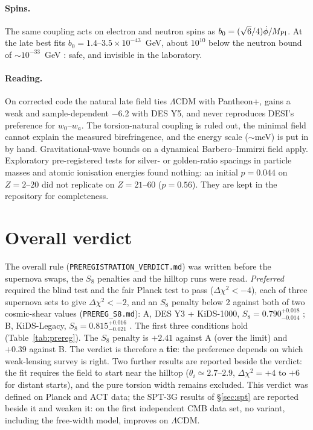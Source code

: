 \documentclass[11pt]{article}
\newcommand{\Mp}{M_{\rm Pl}}
\begin{document}
\paragraph{Spins.} The same coupling acts on electron and neutron spins as $b_0=(\sqrt6/4)\dot\phi/\Mp$. At the late
best fits $b_0=1.4$--$3.5\times10^{-43}$~GeV, about $10^{10}$ below the neutron bound of $\sim10^{-33}$~GeV
\cite{brown2010}: safe, and invisible in the laboratory.

\paragraph{Reading.} On corrected code the natural late field ties $\Lambda$CDM with Pantheon+, gains a weak and
sample-dependent $-6.2$ with DES Y5, and never reproduces DESI's preference for $w_0$--$w_a$. The torsion-natural
coupling is ruled out, the minimal field cannot explain the measured birefringence, and the energy scale ($\sim$meV)
is put in by hand. Gravitational-wave bounds on a dynamical Barbero--Immirzi field \cite{gao2026} apply. Exploratory
pre-registered tests for silver- or golden-ratio spacings in particle masses and atomic ionisation energies found
nothing: an initial $p=0.044$ on $Z=2$--$20$ did not replicate on $Z=21$--$60$ ($p=0.56$). They are kept in the
repository for completeness.

\section{Overall verdict}\label{sec:verdict}
The overall rule (\texttt{PREREGISTRATION\_VERDICT.md}) was written before the supernova swaps,
the $S_8$ penalties and the hilltop runs were read. \emph{Preferred} required the blind test and
the fair Planck test to pass ($\Delta\chi^2<-4$), each of three supernova sets to give
$\Delta\chi^2<-2$, and an $S_8$ penalty below 2 against both of two cosmic-shear values
(\texttt{PREREG\_S8.md}): A, DES Y3 + KiDS-1000, $S_8=0.790^{+0.018}_{-0.014}$ \cite{deskids2023}; B,
KiDS-Legacy, $S_8=0.815^{+0.016}_{-0.021}$ \cite{kidslegacy2025}. The first three conditions hold
(Table~\ref{tab:prereg}). The $S_8$ penalty is $+2.41$ against A (over the limit) and $+0.39$ against B.
The verdict is therefore a \textbf{tie}: the preference depends on which weak-lensing survey is
right. Two further results are reported beside the verdict: the fit requires the field to start
near the hilltop ($\theta_i\simeq2.7$--$2.9$, $\Delta\chi^2=+4$ to $+6$ for distant starts), and the
pure torsion width remains excluded. This verdict was defined on Planck and ACT data; the SPT-3G results
of \S\ref{sec:spt} are reported beside it and weaken it: on the first independent CMB data set, no
variant, including the free-width model, improves on $\Lambda$CDM.
\end{document}
